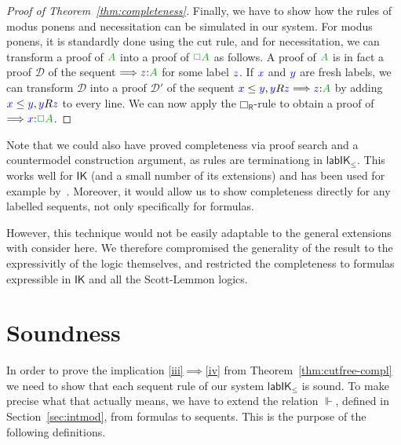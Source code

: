 \documentclass[a4paper]{article}
\theoremstyle{plain}
\theoremstyle{definition}
\newcommand*{\IK}{\mathsf{IK}}
\newcommand*{\labIKp}{\lab\IK_{\le}}
\newcommand*{\BOX}{\mathord{\Box}}
\newcommand*{\fm}[1]{{\color{notgreen}{#1}}}
\newcommand*{\lb}[1]{{\color{blue}{#1}}}
\newcommand*{\labels}[2]{\lb{#1}\mathord{:}\fm{#2}}
\newcommand*{\accs}[2]{\lb{#1}R\lb{#2}}
\newcommand*{\futs}[2]{\lb{#1}\le{\lb{#2}}}
\newcommand{\SEQ}{\Longrightarrow}
\newcommand*{\rn}[1]  {\ensuremath{\mathsf{#1}}}
\newcommand*{\lab}{\mathsf{lab}}
\newcommand*{\rlabrn}[2][]  {\rn{#2}_\rn{R#1}}%
\newcommand*{\DD}{\mathcal{D}}
\begin{document}
\begin{proof}[Proof of Theorem~\ref{thm:completeness}]
	
	
	Finally, we have to show how the rules of modus ponens and
	necessitation can be simulated in our system. For modus ponens, it
	is standardly done using the cut rule, and for necessitation, we can
	transform a proof of $\fm A$ into a proof of $\fm{\BOX A}$ as
	follows.
	A proof of $\fm A$ is in fact a proof $\DD$ of the sequent
	$\SEQ{\labels{z}{A}}$ for some label $\lb z$. If $\lb x$ and $\lb y$
	are fresh labels, we can transform $\DD$ into a proof $\DD'$ of the
	sequent $\futs xy, \accs yz \SEQ \labels{z}{A}$ by adding $\futs xy,
	\accs yz$ to every line. We can now apply the $\rlabrn\BOX$-rule to
	obtain a proof of $\SEQ \labels{x}{\BOX A}$.
%	
\end{proof}


Note that we could also have proved completeness via proof search and a countermodel construction argument, as rules are terminationg in $\labIKp$. 
%
This works well for $\IK$ (and a small number of its extensions) and has been used for example by~\cite{maffezioli:etal:synthese13}. 
%
Moreover, it would allow us to show completeness directly for any labelled sequents, not only specifically for formulas. 

However, this technique would not be easily adaptable to the general extensions with consider here. 
%
We therefore compromised the generality of the result to the expressivitly of the logic themselves, and restricted the completeness to formulas expressible in $\IK$ and all the Scott-Lemmon logics.

\section{Soundness}\label{sec:soundness}

In order to prove the implication \ref{iii}$\implies$\ref{iv} from
Theorem~\ref{thm:cutfree-compl} we need to show that each sequent rule
of our system $\labIKp$ is sound. To make precise what that actually
means, we have to extend the relation $\Vdash$, defined in
Section~\ref{sec:intmod}, from formulas to sequents. This is the
purpose of the following definitions.
\end{document}
